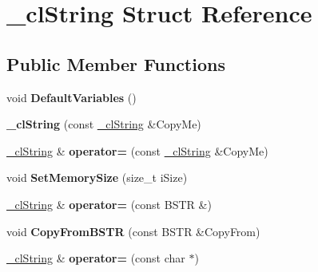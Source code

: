 \hypertarget{struct__cl_string}{
\section{\_\-clString Struct Reference}
\label{struct__cl_string}
}
\subsection*{Public Member Functions}
\begin{DoxyCompactItemize}
\item 
\hypertarget{struct__cl_string_aa5737a98a83e9e9bfad00508df6e5318}{
void {\bfseries DefaultVariables} ()}
\label{struct__cl_string_aa5737a98a83e9e9bfad00508df6e5318}

\item 
\hypertarget{struct__cl_string_a2d9966df173f977f4ead8d5d422a69bc}{
{\bfseries \_\-clString} (const \hyperlink{struct__cl_string}{\_\-clString} \&CopyMe)}
\label{struct__cl_string_a2d9966df173f977f4ead8d5d422a69bc}

\item 
\hypertarget{struct__cl_string_a917324271e8b4ac1759a017ddc75cee5}{
\hyperlink{struct__cl_string}{\_\-clString} \& {\bfseries operator=} (const \hyperlink{struct__cl_string}{\_\-clString} \&CopyMe)}
\label{struct__cl_string_a917324271e8b4ac1759a017ddc75cee5}

\item 
\hypertarget{struct__cl_string_a76640314a83ad1adc64416e1130dc120}{
void {\bfseries SetMemorySize} (size\_\-t iSize)}
\label{struct__cl_string_a76640314a83ad1adc64416e1130dc120}

\item 
\hypertarget{struct__cl_string_a7303e458d35cfc0843d970120232a873}{
\hyperlink{struct__cl_string}{\_\-clString} \& {\bfseries operator=} (const BSTR \&)}
\label{struct__cl_string_a7303e458d35cfc0843d970120232a873}

\item 
\hypertarget{struct__cl_string_abc3490f79f1ebbc5f289475b360daedf}{
void {\bfseries CopyFromBSTR} (const BSTR \&CopyFrom)}
\label{struct__cl_string_abc3490f79f1ebbc5f289475b360daedf}

\item 
\hypertarget{struct__cl_string_ad309cc7dc71b6e6801170e52d4d5ae8d}{
\hyperlink{struct__cl_string}{\_\-clString} \& {\bfseries operator=} (const char $\ast$)}
\label{struct__cl_string_ad309cc7dc71b6e6801170e52d4d5ae8d}


\end{DoxyCompactItemize}

